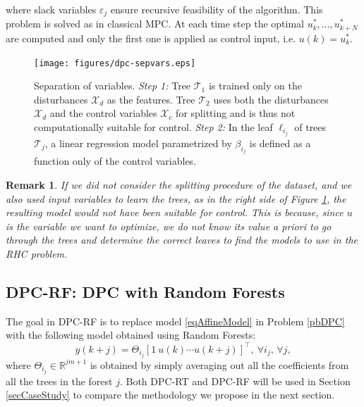 \documentclass[]{ifacconf}  %
\newtheorem{remark}{Remark}
\begin{document}
where slack variables $\varepsilon_j$ ensure recursive feasibility of the algorithm. This problem is solved as in classical MPC. At each time step the optimal $u^*_k,\ldots,u^*_{k+N}$ are computed and only the first one is applied as control input, i.e. $u(k) = u^*_k$.
\begin{figure}[t!]
	\begin{center}
		\texttt{[image: figures/dpc-sepvars.eps]}
		\caption{Separation of variables. \textit{Step 1:} Tree $\mathcal{T}_1$ is trained only on the disturbances $\mathcal{X}_d$ as the features. Tree $\mathcal{T}_2$ uses both the disturbances $\mathcal{X}_d$ and the control variables $\mathcal{X}_c$ for splitting and is thus not computationally suitable for control. \textit{Step 2:} In the leaf $\ell_{i_j}$ of trees $\mathcal{T}_j$, a linear regression model parametrized by $\beta_{i_j}$ is defined as a function only of the control variables.}\label{figSeparationVariables}
	\end{center}
\end{figure}

\begin{remark}
	If we did not consider the splitting procedure of the dataset, and we also used input variables to learn the trees, as in the right side of Figure \ref{figSeparationVariables}, the resulting model would not have been suitable for control. This is because, since $u$ is the variable we want to optimize, we do not know its value a priori to go through the trees and determine the correct leaves to find the models to use in the  RHC problem.
\end{remark}

\subsection{DPC-RF: DPC with Random Forests}\label{ssecDPC-RF}
The goal in DPC-RF is to replace model \eqref{eqAffineModel} in Problem \ref{pbDPC} with the following model obtained using Random Forests:
\small
\begin{equation}\label{eqAffineModelRF}
y(k+j) = \Theta_{i_j}[1\ u(k) \cdots u(k+j)]^\top,\ \forall i_j,\,\forall j,
\end{equation}
\normalsize
where $\Theta_{i_j}\in\mathbb{R}^{jm+1}$ is obtained by simply averaging out all the coefficients from all the trees in the forest $j$. 
Both DPC-RT and DPC-RF will be used in Section \ref{secCaseStudy} to compare the methodology we propose in the next section.

\end{document}
